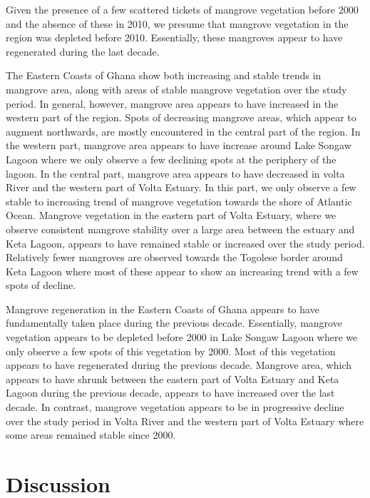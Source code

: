 \documentclass[12pt,oneside,preprint,3p,authoryear,times]{elsarticle} %
\begin{document}
Given the presence of a few scattered tickets of mangrove vegetation
before 2000 and the absence of these in 2010, we presume that mangrove
vegetation in the region was depleted before 2010. Essentially, these
mangroves appear to have regenerated during the last decade.

The Eastern Coasts of Ghana show both increasing and stable trends in
mangrove area, along with areas of stable mangrove vegetation over the
study period. In general, however, mangrove area appears to have
increased in the western part of the region. Spots of decreasing
mangrove areas, which appear to augment northwards, are mostly
encountered in the central part of the region. In the western part,
mangrove area appears to have increase around Lake Songaw Lagoon where
we only observe a few declining spots at the periphery of the lagoon. In
the central part, mangrove area appears to have decreased in volta River
and the western part of Volta Estuary. In this part, we only observe a
few stable to increasing trend of mangrove vegetation towards the shore
of Atlantic Ocean. Mangrove vegetation in the eastern part of Volta
Estuary, where we observe consistent mangrove stability over a large
area between the estuary and Keta Lagoon, appears to have remained
stable or increased over the study period. Relatively fewer mangroves
are observed towards the Togolese border around Keta Lagoon where most
of these appear to show an increasing trend with a few spots of decline.

Mangrove regeneration in the Eastern Coasts of Ghana appears to have
fundamentally taken place during the previous decade. Essentially,
mangrove vegetation appears to be depleted before 2000 in Lake Songaw
Lagoon where we only observe a few spots of this vegetation by 2000.
Most of this vegetation appears to have regenerated during the previous
decade. Mangrove area, which appears to have shrunk between the eastern
part of Volta Estuary and Keta Lagoon during the previous decade,
appears to have increased over the last decade. In contrast, mangrove
vegetation appears to be in progressive decline over the study period in
Volta River and the western part of Volta Estuary where some areas
remained stable since 2000.

\hypertarget{discussion}{%
\section{Discussion}\label{discussion}}
\end{document}
